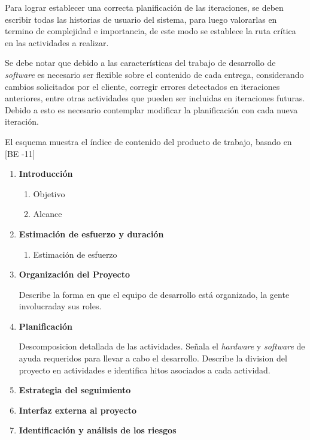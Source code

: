 Para lograr establecer una correcta planificación de las iteraciones, se deben escribir todas las historias de usuario del sistema, para luego valorarlas en termino de complejidad e importancia, de este modo se establece la ruta crítica en las actividades a realizar. 

Se debe notar que debido a las características del trabajo de desarrollo de \emph{software} es necesario ser flexible sobre el contenido de cada entrega, considerando cambios solicitados por el cliente, corregir errores detectados en iteraciones anteriores, entre otras actividades que pueden ser incluidas en iteraciones futuras. Debido a esto es necesario contemplar modificar la planificación con cada nueva iteración.

El esquema muestra el índice de contenido del producto de trabajo, basado en [BE -11]

\begin{framed}
     \begin{enumerate}
		\item \textbf{Introducción}
		\begin{enumerate}
			\item Objetivo
			\item Alcance 
		\end{enumerate}
		\item \textbf{Estimación de esfuerzo y duración}
		\begin{enumerate}
			\item Estimación de esfuerzo
		\end{enumerate}		
		\item \textbf{Organización del Proyecto}

		Describe la forma en que el equipo de desarrollo está organizado, la gente involucraday sus roles.
		\item \textbf{Planificación}

		Descomposicion detallada de las actividades. Señala el \emph{hardware} y \emph{software} de ayuda requeridos para llevar a cabo el desarrollo. Describe la division del proyecto en actividades e identifica hitos asociados a cada actividad.
		\item \textbf{Estrategia del seguimiento}
		\item \textbf{Interfaz externa al proyecto}
		\item \textbf{Identificación y análisis de los riesgos}
	\end{enumerate}
\end{framed}

